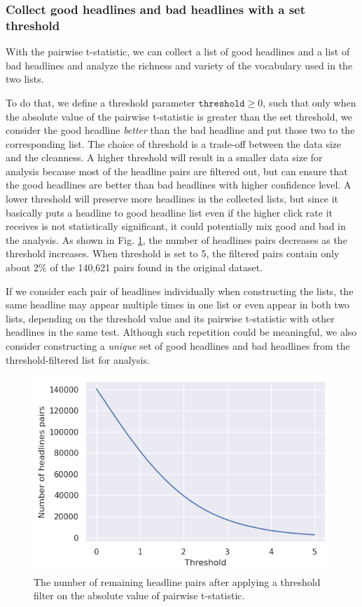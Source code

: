 \documentclass[%
preprint,
 amsmath,amssymb,
 aps,
]{revtex4-2}
\begin{document}
\subsubsection{Collect good headlines and bad headlines with a set threshold}

With the pairwise t-statistic, we can collect a list of good headlines and a list of bad headlines and analyze the richness and variety of the vocabulary used in the two lists.

To do that, we define a threshold parameter \(\texttt{threshold} \geq 0\), such that only when the absolute value of the pairwise t-statistic is greater than the set threshold, we consider the good headline \textit{better} than the bad headline and put those two to the corresponding list.
The choice of threshold is a trade-off between the data size and the cleanness.
A higher threshold will result in a smaller data size for analysis because most of the headline pairs are filtered out, but can ensure that the good headlines are better than bad headlines with higher confidence level.
A lower threshold will preserve more headlines in the collected lists, but since it basically puts a headline to good headline list even if the higher click rate it receives is not statistically significant, it could potentially mix good and bad in the analysis.
As shown in Fig. \ref{fig:ttr1_threshold}, the number of headlines pairs decreases as the threshold increases.
When threshold is set to 5, the filtered pairs contain only about 2\% of the 140,621 pairs found in the original dataset.

If we consider each pair of headlines individually when constructing the lists, the same headline may appear multiple times in one list or even appear in both two lists, depending on the threshold value and its pairwise t-statistic with other headlines in the same test.
Although such repetition could be meaningful, we also consider constructing a \textit{unique} set of good headlines and bad headlines from the threshold-filtered list for analysis.

\begin{figure}
    \centering
    \includegraphics[width=0.5\linewidth]{fig/ttr1_threshold.png}
    \caption{The number of remaining headline pairs after applying a threshold filter on the absolute value of pairwise t-statistic.}
    \label{fig:ttr1_threshold}
\end{figure}
\end{document}
